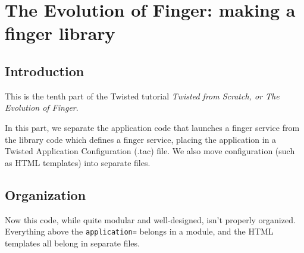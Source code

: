 \section{The Evolution of Finger: making a finger library\label{doc/howto/tutorial/library.xhtml}}


\subsection{Introduction}


 This is the tenth part of the Twisted tutorial \textit{Twisted from Scratch, or The Evolution of Finger}.

In this part, we separate the application code that launches a finger service from the library code which defines a finger service, placing the application in a Twisted Application Configuration (.tac) file. We also move configuration (such as HTML templates) into separate files.

\subsection{Organization}


Now this code, while quite modular and well-designed, isn't properly organized. Everything above the \texttt{application=} belongs in a module, and the HTML templates all belong in separate files. 


